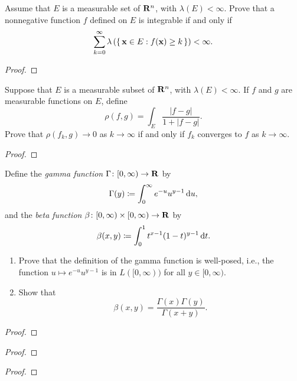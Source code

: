\begin{problem}
Assume that $E$ is a measurable set of $\mathbf{R}^n$, with $\lambda(E)<\infty$. Prove
that a nonnegative function $f$ defined on $E$ is integrable if and only if
\[
\sum_{k=0}^\infty\lambda\left(\left\{\,\mathbf{x}\in E:f(\mathbf{x})\geq
    k\,\right\}\right)<\infty.
\]
\end{problem}
\begin{proof}
\end{proof}

\begin{problem}
Suppose that $E$ is a measurable subset of $\mathbf{R}^n$, with
$\lambda(E)<\infty$. If $f$ and $g$ are measurable functions on $E$, define
\[
\rho(f,g)=\int_E\frac{|f-g|}{1+|f-g|}.
\]
Prove that $\rho(f_k,g)\to 0$ as $k\to\infty$ if and only if $f_k$
converges to $f$ as $k\to\infty$.
\end{problem}
\begin{proof}
\end{proof}

\begin{problem}
Define the \emph{gamma function} $\Gamma\colon[0,\infty)\to\mathbf{R}$ by
\[
\Gamma(y)\coloneqq\int_0^\infty e^{-u}u^{y-1}\mathop{}\!\mathrm{d} u,
\]
and the \emph{beta function} $\beta\colon[0,\infty)\times[0,\infty)\to\mathbf{R}$
by
\[
\beta(x,y)\coloneqq\int_0^1 t^{x-1}(1-t)^{y-1}\mathop{}\!\mathrm{d} t.
\]
\begin{enumerate}[label=(\alph*)]
\item Prove that the definition of the gamma function is well-posed, i.e.,
  the function $u\mapsto e^{-u}u^{y-1}$ is in $L([0,\infty))$ for all
  $y\in[0,\infty)$.
\item Show that
\[
\beta(x,y)=\frac{\Gamma(x)\Gamma(y)}{\Gamma(x+y)}.
\]
\end{enumerate}
\end{problem}
\begin{proof}
\end{proof}

\begin{problem}
\end{problem}
\begin{proof}
\end{proof}

\begin{problem}
\end{problem}
\begin{proof}
\end{proof}

